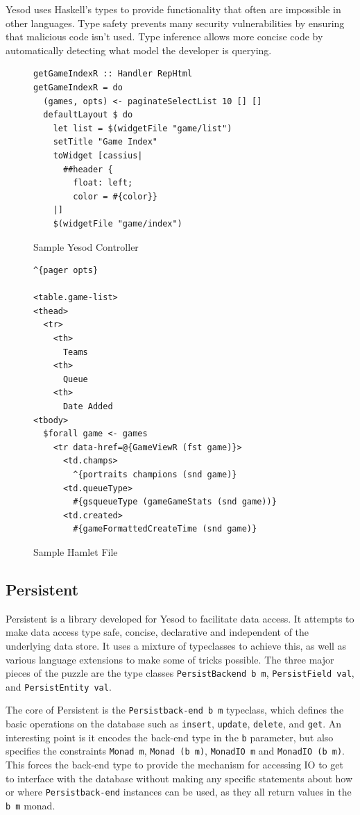 \documentclass[letterpaper,twocolumn,9pt]{article}
\newcommand{\code}[1]{\texttt{#1}}
\begin{document}
Yesod uses Haskell's types to provide functionality that often are impossible in other languages. Type safety prevents many security vulnerabilities by ensuring that malicious code isn't used. Type inference allows more concise code by automatically detecting what model the developer is querying.


\begin{figure}[]
\begin{verbatim}
getGameIndexR :: Handler RepHtml
getGameIndexR = do
  (games, opts) <- paginateSelectList 10 [] []
  defaultLayout $ do
    let list = $(widgetFile "game/list")
    setTitle "Game Index"
    toWidget [cassius|
      ##header {
        float: left;
        color = #{color}}
    |] 
    $(widgetFile "game/index")
\end{verbatim}
    \caption{Sample Yesod Controller}
    \label{controller}
\end{figure}

\begin{figure}[]
\begin{verbatim}
^{pager opts}

<table.game-list>
<thead>
  <tr>
    <th>
      Teams
    <th>
      Queue
    <th>
      Date Added
<tbody>
  $forall game <- games
    <tr data-href=@{GameViewR (fst game)}>
      <td.champs>
        ^{portraits champions (snd game)}
      <td.queueType>
        #{gsqueueType (gameGameStats (snd game))}
      <td.created>
        #{gameFormattedCreateTime (snd game)}
\end{verbatim}
    \caption{Sample Hamlet File}
    \label{hamlet}
\end{figure}

\subsection{Persistent}

Persistent is a library developed for Yesod to facilitate data access.  It attempts to make data access type safe, concise, declarative and independent of the underlying data store.  It uses a mixture of typeclasses to achieve this, as well as various language extensions to make some of tricks possible.  The three major pieces of the puzzle are the type classes \code{PersistBackend b m}, \code{PersistField val}, and \code{PersistEntity val}.

The core of Persistent is the \code{Persistback-end b m} typeclass, which defines the basic operations on the database such as \code{insert}, \code{update}, \code{delete}, and \code{get}.  An interesting point is it encodes the back-end type in the \code{b} parameter, but also specifies the constraints \code{Monad m}, \code{Monad (b m)}, \code{MonadIO m} and \code{MonadIO (b m)}.  This forces the back-end type to provide the mechanism for accessing IO to get to interface with the database without making any specific statements about how or where \code{Persistback-end} instances can be used, as they all return values in the \code{b m} monad.
\end{document}
